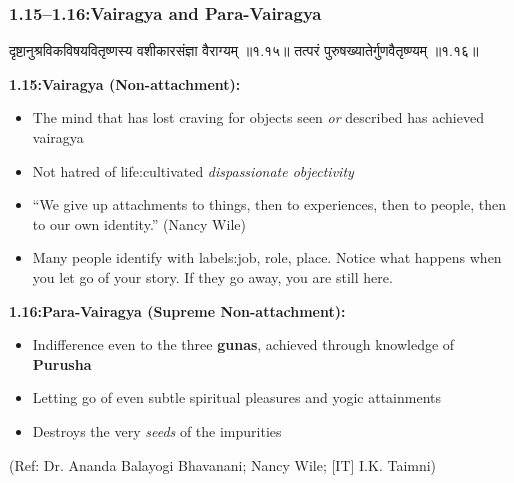 \begin{frame}[fragile]\frametitle{1.15–1.16:Vairagya and Para-Vairagya}

\begin{sanskrit}
दृष्टानुश्रविकविषयवितृष्णस्य वशीकारसंज्ञा वैराग्यम् ॥१.१५॥
तत्परं पुरुषख्यातेर्गुणवैतृष्ण्यम् ॥१.१६॥
\end{sanskrit}

\textbf{1.15:Vairagya (Non-attachment):}
\begin{itemize}
\item The mind that has lost craving for objects seen \emph{or} described has achieved vairagya
\item Not hatred of life:cultivated \emph{dispassionate objectivity}
\item ``We give up attachments to things, then to experiences, then to people, then to our own identity.'' (Nancy Wile)
\item Many people identify with labels:job, role, place. Notice what happens when you let go of your story. If they go away, you are still here.
\end{itemize}

\textbf{1.16:Para-Vairagya (Supreme Non-attachment):}
\begin{itemize}
\item Indifference even to the three \textbf{gunas}, achieved through knowledge of \textbf{Purusha}
\item Letting go of even subtle spiritual pleasures and yogic attainments
\item Destroys the very \emph{seeds} of the impurities
\end{itemize}

\tiny{(Ref: Dr. Ananda Balayogi Bhavanani; Nancy Wile; [IT] I.K. Taimni)}

\end{frame}

